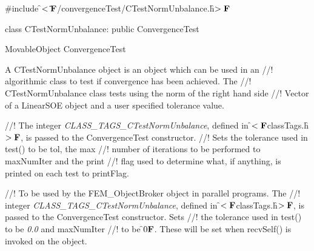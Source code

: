 
\indent \#include \f$<\tilde{}{\bf F}$/convergenceTest/CTestNormUnbalance.h\f$>{\bf F}$

\indent class CTestNormUnbalance: public ConvergenceTest

\indent MovableObject
\indent\indent ConvergenceTest
\indent\indent{}

\indent A CTestNormUnbalance object is an object which can be used in an
//! algorithmic class to test if convergence has been achieved. The
//! CTestNormUnbalance class tests using the norm of the right hand side
//! Vector of a LinearSOE object and a user specified tolerance value.


\indent{} 
\indent{}  
\indent{}
\indent{} 
\indent{}
\indent{} 
\indent{}
\indent{}
\indent{}
\indent{}
\indent{} 
\indent{} 

//! The integer {\em CLASS\_TAGS\_CTestNormUnbalance}, defined in
\f$<{\bf F}$classTags.h\f$>{\bf F}$, is passed to the ConvergenceTest constructor. 
//! Sets the tolerance used in test() to be \p tol, the max
//! number of iterations to be performed to \p maxNumIter and the print
//! flag used to determine what, if anything, is printed on each test to
\p printFlag.

//! To be used by the FEM\_ObjectBroker object in parallel programs. The
//! integer {\em CLASS\_TAGS\_CTestNormUnbalance}, defined in
\f$<{\bf F}$classTags.h\f$>{\bf F}$, is passed to the ConvergenceTest constructor. Sets
//! the tolerance used in test() to be {\em 0.0} and \p maxNumIter 
//! to be \f$0{\bf F}$. These will be set when recvSelf() is invoked on the object.

